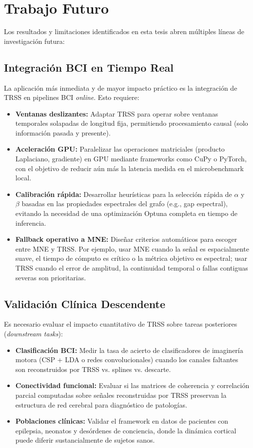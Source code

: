 \section{Trabajo Futuro}

Los resultados y limitaciones identificados en esta tesis abren múltiples líneas de investigación futura:

\subsection{Integración BCI en Tiempo Real}

La aplicación más inmediata y de mayor impacto práctico es la integración de TRSS en pipelines BCI \textit{online}. Esto requiere:
\begin{itemize}
    \item \textbf{Ventanas deslizantes:} Adaptar TRSS para operar sobre ventanas temporales solapadas de longitud fija, permitiendo procesamiento causal (solo información pasada y presente).
    \item \textbf{Aceleración GPU:} Paralelizar las operaciones matriciales (producto Laplaciano, gradiente) en GPU mediante frameworks como CuPy o PyTorch, con el objetivo de reducir aún más la latencia medida en el microbenchmark local.
    \item \textbf{Calibración rápida:} Desarrollar heurísticas para la selección rápida de $\alpha$ y $\beta$ basadas en las propiedades espectrales del grafo (e.g., gap espectral), evitando la necesidad de una optimización Optuna completa en tiempo de inferencia.
    \item \textbf{Fallback operativo a MNE:} Diseñar criterios automáticos para escoger entre MNE y TRSS. Por ejemplo, usar MNE cuando la señal es espacialmente suave, el tiempo de cómputo es crítico o la métrica objetivo es espectral; usar TRSS cuando el error de amplitud, la continuidad temporal o fallas contiguas severas son prioritarias.
\end{itemize}

\subsection{Validación Clínica Descendente}

Es necesario evaluar el impacto cuantitativo de TRSS sobre tareas posteriores (\textit{downstream tasks}):
\begin{itemize}
    \item \textbf{Clasificación BCI:} Medir la tasa de acierto de clasificadores de imaginería motora (CSP + LDA o redes convolucionales) cuando los canales faltantes son reconstruidos por TRSS vs. splines vs. descarte.
    \item \textbf{Conectividad funcional:} Evaluar si las matrices de coherencia y correlación parcial computadas sobre señales reconstruidas por TRSS preservan la estructura de red cerebral para diagnóstico de patologías.
    \item \textbf{Poblaciones clínicas:} Validar el framework en datos de pacientes con epilepsia, neonatos y desórdenes de conciencia, donde la dinámica cortical puede diferir sustancialmente de sujetos sanos.
\end{itemize}

